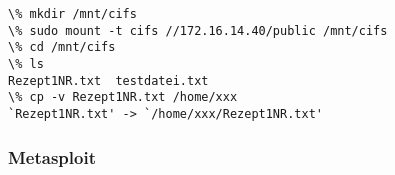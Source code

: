 \begin{lstlisting}
\% mkdir /mnt/cifs
\% sudo mount -t cifs //172.16.14.40/public /mnt/cifs
\% cd /mnt/cifs
\% ls
Rezept1NR.txt  testdatei.txt
\% cp -v Rezept1NR.txt /home/xxx
`Rezept1NR.txt' -> `/home/xxx/Rezept1NR.txt'
\end{lstlisting}

\subsubsection{Metasploit}


\begin{lstlisting}

\end{lstlisting}
